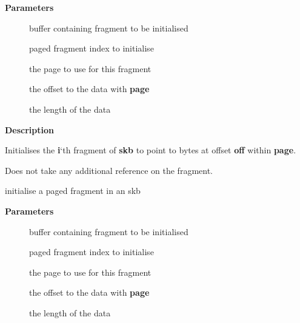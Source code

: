 \documentclass[a4paper,8pt,english]{sphinxmanual}
\begin{document}
\textbf{Parameters}
\begin{description}
\item[{}] \leavevmode
buffer containing fragment to be initialised

\item[{}] \leavevmode
paged fragment index to initialise

\item[{}] \leavevmode
the page to use for this fragment

\item[{}] \leavevmode
the offset to the data with \textbf{page}

\item[{}] \leavevmode
the length of the data

\end{description}

\textbf{Description}

Initialises the \textbf{i}`th fragment of \textbf{skb} to point to  bytes at
offset \textbf{off} within \textbf{page}.

Does not take any additional reference on the fragment.

\begin{fulllineitems}
\label{networking/kapi:c.skb_fill_page_desc}
initialise a paged fragment in an skb

\end{fulllineitems}


\textbf{Parameters}
\begin{description}
\item[{}] \leavevmode
buffer containing fragment to be initialised

\item[{}] \leavevmode
paged fragment index to initialise

\item[{}] \leavevmode
the page to use for this fragment

\item[{}] \leavevmode
the offset to the data with \textbf{page}

\item[{}] \leavevmode
the length of the data

\end{description}
\end{document}
